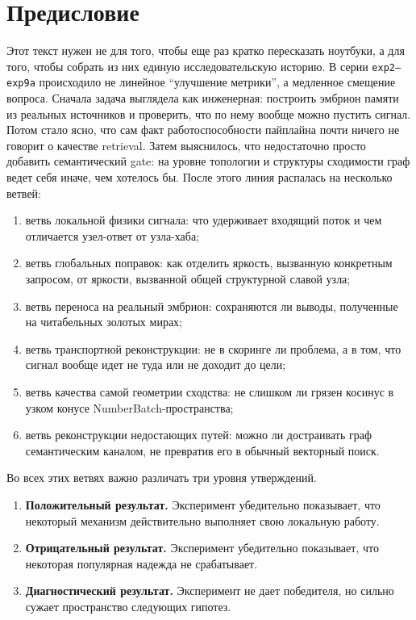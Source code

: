 \chapter*{Предисловие}

Этот текст нужен не для того, чтобы еще раз кратко пересказать ноутбуки, а для
того, чтобы собрать из них единую исследовательскую историю. В серии
\texttt{exp2--exp9a} происходило не линейное ``улучшение метрики'', а медленное
смещение вопроса. Сначала задача выглядела как инженерная: построить эмбрион
памяти из реальных источников и проверить, что по нему вообще можно пустить
сигнал. Потом стало ясно, что сам факт работоспособности пайплайна почти ничего
не говорит о качестве retrieval. Затем выяснилось, что недостаточно просто
добавить семантический gate: на уровне топологии и структуры сходимости граф
ведет себя иначе, чем хотелось бы. После этого линия распалась на несколько
ветвей:

\begin{enumerate}[leftmargin=2em]
\item ветвь локальной физики сигнала: что удерживает входящий поток и чем
отличается узел-ответ от узла-хаба;
\item ветвь глобальных поправок: как отделить яркость, вызванную конкретным
запросом, от яркости, вызванной общей структурной славой узла;
\item ветвь переноса на реальный эмбрион: сохраняются ли выводы, полученные на
читабельных золотых мирах;
\item ветвь транспортной реконструкции: не в скоринге ли проблема, а в том, что
сигнал вообще идет не туда или не доходит до цели;
\item ветвь качества самой геометрии сходства: не слишком ли грязен косинус в
узком конусе NumberBatch-пространства;
\item ветвь реконструкции недостающих путей: можно ли достраивать граф
семантическим каналом, не превратив его в обычный векторный поиск.
\end{enumerate}

Во всех этих ветвях важно различать три уровня утверждений.

\begin{enumerate}[leftmargin=2em]
\item \textbf{Положительный результат.} Эксперимент убедительно показывает, что
некоторый механизм действительно выполняет свою локальную работу.
\item \textbf{Отрицательный результат.} Эксперимент убедительно показывает, что
некоторая популярная надежда не срабатывает.
\item \textbf{Диагностический результат.} Эксперимент не дает победителя, но
сильно сужает пространство следующих гипотез.
\end{enumerate}

